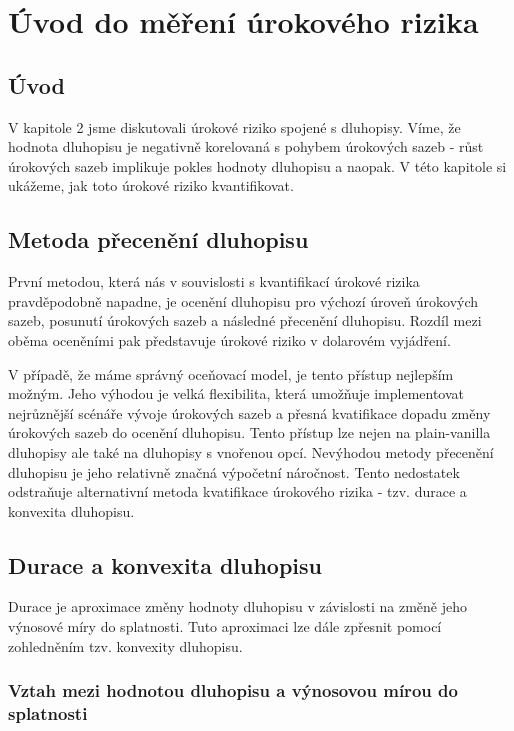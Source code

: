 \documentclass[a4paper]{book}
\begin{document}
\chapter{Úvod do měření úrokového rizika}

\section{Úvod}

V kapitole 2 jsme diskutovali úrokové riziko spojené s dluhopisy. Víme, že hodnota dluhopisu je negativně korelovaná s pohybem úrokových sazeb - růst úrokových sazeb implikuje pokles hodnoty dluhopisu a naopak. V této kapitole si ukážeme, jak toto úrokové riziko kvantifikovat.

\section{Metoda přecenění dluhopisu}

První metodou, která nás v souvislosti s kvantifikací úrokové rizika pravděpodobně napadne, je ocenění dluhopisu pro výchozí úroveň úrokových sazeb, posunutí úrokových sazeb a následné přecenění dluhopisu. Rozdíl mezi oběma oceněními pak představuje úrokové riziko v dolarovém vyjádření.

V případě, že máme správný oceňovací model, je tento přístup nejlepším možným. Jeho výhodou je velká flexibilita, která umožňuje implementovat nejrůznější scénáře vývoje úrokových sazeb a přesná kvatifikace dopadu změny úrokových sazeb do ocenění dluhopisu. Tento přístup lze nejen na plain-vanilla dluhopisy ale také na dluhopisy s vnořenou opcí. Nevýhodou metody přecenění dluhopisu je jeho relativně značná výpočetní náročnost. Tento nedostatek odstraňuje alternativní metoda kvatifikace úrokového rizika - tzv. durace a konvexita dluhopisu.

\section{Durace a konvexita dluhopisu}

Durace je aproximace změny hodnoty dluhopisu v závislosti na změně jeho výnosové míry do splatnosti. Tuto aproximaci lze dále zpřesnit pomocí zohledněním tzv. konvexity dluhopisu.

\subsection{Vztah mezi hodnotou dluhopisu a výnosovou mírou do splatnosti}
\end{document}
